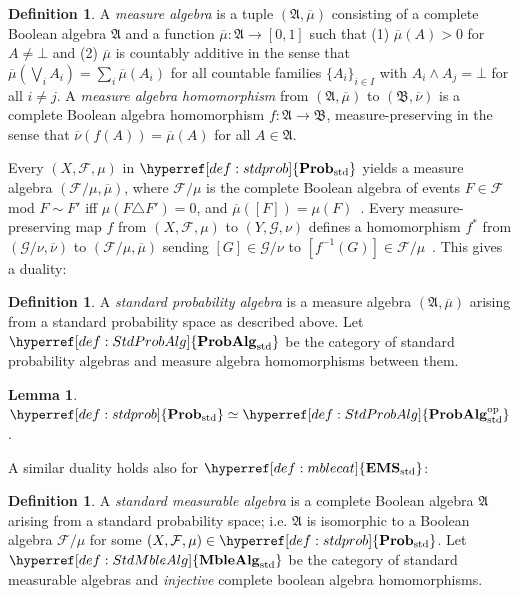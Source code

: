 \documentclass[
  sigconf,
  screen, ]{acmart}
\theoremstyle{definition}
\newtheorem{lemma}[theorem]{Lemma}
\newtheorem{definition}[theorem]{Definition}
\newcommand\calF{\mathcal F}
\newcommand\calG{\mathcal G}
\newcommand\frakA{\mathfrak A}
\newcommand\frakB{\mathfrak B}
\newcommand\fremlinf[3]{\cite[\href{https://www1.essex.ac.uk/maths/people/fremlin/chap#2.pdf\#page=#3}{#1}]{fremlin2000measure}}
\newcommand\nref[2]{\hyperref[#1]{#2}} \newcommand\checkhigh{{\huge{\color{red}\textbf{TODO: check}}}}
\newcommand\op{^{\rm op}}
\newcommand\texStdProb{\mathbf{Prob}_{\rm std}}
\newcommand\StdProb{{\nref{def:stdprob}{\texStdProb}}}
\newcommand\StdProbAlg{\nref{def:StdProbAlg}{\mathbf{ProbAlg}_{\rm std}}}
\newcommand\StdProbAlgop{\nref{def:StdProbAlg}{\mathbf{ProbAlg}_{\rm std}\op}}
\newcommand\texStdMble{\mathbf{EMS}_{\rm std}}
\newcommand\StdMble{{\nref{def:mblecat}{\texStdMble}}}
\newcommand\StdMbleAlg{{\nref{def:StdMbleAlg}{\mathbf{MbleAlg}_{\rm std}}}}
\begin{document}
\begin{definition}
  A \emph{measure algebra} is a tuple $(\frakA,\overline\mu)$
  consisting of a complete Boolean algebra $\frakA$
  and a function $\overline\mu : \frakA\to[0,1]$
  such that (1) $\overline\mu(A) > 0$ for $A\ne\bot$
  and (2)
  $\overline\mu$ is countably additive in the sense that
  $\overline\mu(\bigvee_i A_i) = \sum_i\overline\mu(A_i)$
  for all countable families $\{A_i\}_{i\in I}$ with $A_i\wedge A_j = \bot$
  for all $i\ne j$.
  A \emph{measure algebra homomorphism}
  from $(\frakA,\overline\mu)$ to $(\frakB,\overline\nu)$
  is a complete Boolean algebra homomorphism $f : \frakA\to\frakB$,
  measure-preserving in the sense that $\overline\nu(f(A)) = \overline\mu(A)$
  for all $A\in\frakA$.
\end{definition}

Every $(X,\calF,\mu)$ in $\StdProb$ yields a measure algebra
$(\calF/\mu,\overline\mu)$,
where $\calF/\mu$ is the complete Boolean algebra
of events $F\in\calF$ mod $F\sim F'$ iff $\mu(F\triangle F') = 0$,
and $\overline\mu([F]) = \mu(F)$~\fremlinf{321H}{32}{3}.
Every measure-preserving map $f$ from $(X,\calF,\mu)$ to $(Y,\calG,\nu)$
defines a homomorphism $f^*$ from $(\calG/\nu,\overline\nu)$ to $(\calF/\mu,\overline\mu)$
sending $[G]\in\calG/\nu$ to $[f^{-1}(G)]\in\calF/\mu$~\fremlinf{324M}{32}{26}.
This gives a duality:
\begin{definition} \label{def:StdProbAlg}
  A \emph{standard probability algebra}
  is a measure algebra $(\frakA,\overline\mu)$
  arising from a standard probability space
  as described above.
  Let $\StdProbAlg$ be the category of standard probability algebras
  and measure algebra homomorphisms between them.
\end{definition}
\begin{lemma} \label{lem:dual1}
  $\StdProb\simeq \StdProbAlgop$. \end{lemma}

A similar duality holds also for $\StdMble$:

\begin{definition} \label{def:StdMbleAlg}
  A \emph{standard measurable algebra}
  is a complete Boolean algebra $\frakA$
  arising from a standard probability space;
  i.e. $\frakA$ is isomorphic to a Boolean algebra $\calF/\mu$
  for some $(X,\calF,\mu)\in\StdProb$.
  Let $\StdMbleAlg$ be the category
  of standard measurable algebras
  and \emph{injective} complete boolean algebra homomorphisms.
\end{definition}
\end{document}
